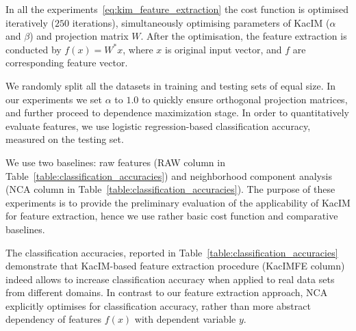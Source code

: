 \documentclass{article}
\begin{document}
In all the experiments~\eqref{eq:kim_feature_extraction} the cost function is optimised iteratively ($250$ iterations), simultaneously optimising parameters of KacIM ($\alpha$ and $\beta$) and projection matrix $W$.
After the optimisation, the feature extraction is conducted by $f(x) = W^{*}x$, where $x$ is original input vector, and $f$ are corresponding feature vector. 



We randomly split all the datasets in training and testing sets of equal size. %
In our experiments we set $\alpha$ to $1.0$ to quickly ensure orthogonal projection matrices, and further proceed to dependence maximization stage. In order to quantitatively evaluate features, we use logistic regression-based classification accuracy, measured on the testing set.


We use two baselines: raw features (RAW column in Table~\ref{table:classification_accuracies}) and neighborhood component analysis~\cite{NIPS2004_42fe8808} (NCA column in Table~\ref{table:classification_accuracies}).  The purpose of these experiments is to provide the preliminary evaluation of the applicability of KacIM for feature extraction, hence we use rather basic cost function and comparative baselines.




The classification accuracies, reported in Table~\ref{table:classification_accuracies} demonstrate that KacIM-based feature extraction procedure (KacIMFE column) indeed allows to increase classification accuracy when applied to real data sets from different domains. In contrast to our feature extraction approach, NCA explicitly optimises for classification accuracy, rather than more abstract dependency of features $f(x)$ with dependent variable $y$.
\end{document}
